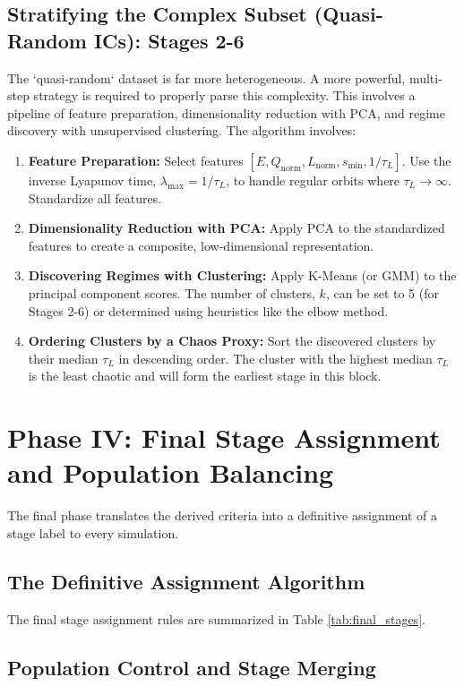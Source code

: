 \subsection{Stratifying the Complex Subset (Quasi-Random ICs): Stages 2-6}

The `quasi-random` dataset is far more heterogeneous. A more powerful, multi-step strategy is required to properly parse this complexity. This involves a pipeline of feature preparation, dimensionality reduction with PCA, and regime discovery with unsupervised clustering. The algorithm involves:
\begin{enumerate}
    \item \textbf{Feature Preparation:} Select features $[E, Q_{\text{norm}}, L_{\text{norm}}, s_{\text{min}}, 1/\tau_L]$. Use the inverse Lyapunov time, $\lambda_{\text{max}} = 1/\tau_L$, to handle regular orbits where $\tau_L \to \infty$. Standardize all features.
    \item \textbf{Dimensionality Reduction with PCA:} Apply PCA to the standardized features to create a composite, low-dimensional representation.
    \item \textbf{Discovering Regimes with Clustering:} Apply K-Means (or GMM) to the principal component scores. The number of clusters, $k$, can be set to 5 (for Stages 2-6) or determined using heuristics like the elbow method.
    \item \textbf{Ordering Clusters by a Chaos Proxy:} Sort the discovered clusters by their median $\tau_L$ in descending order. The cluster with the highest median $\tau_L$ is the least chaotic and will form the earliest stage in this block.
\end{enumerate}

\section{Phase IV: Final Stage Assignment and Population Balancing}

The final phase translates the derived criteria into a definitive assignment of a stage label to every simulation.

\subsection{The Definitive Assignment Algorithm}

The final stage assignment rules are summarized in Table \ref{tab:final_stages}.

\subsection{Population Control and Stage Merging}

